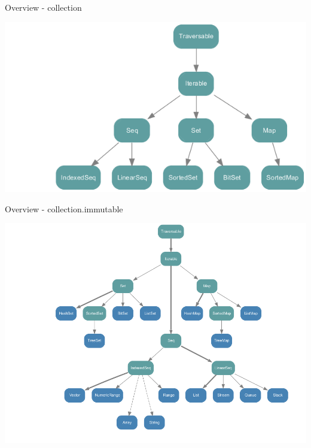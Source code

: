 \begin{frame}{Overview - collection}
\begin{center}
\includegraphics[width = \textwidth]{resources/collection.png}
\end{center}
\end{frame}

\begin{frame}{Overview - collection.immutable}
\begin{center}
\includegraphics[width = \textwidth]{resources/collectionImmutable.png}
\end{center}
\end{frame}

